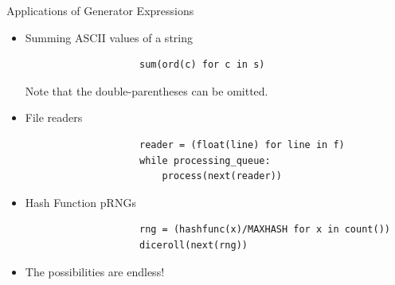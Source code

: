 \documentclass{lug}
\begin{document}
\begin{frame}[fragile]{Applications of Generator Expressions}
    \begin{itemize}[<+->]
        \setlength\itemsep{10pt}
        \item Summing ASCII values of a string

            \begin{minipage}{\linewidth}
                \small
                \begin{verbatim}
                    sum(ord(c) for c in s)
                \end{verbatim}
            \end{minipage}

            {\small Note that the double-parentheses can be omitted.}

        \item File readers
            \smallskip

            \begin{minipage}{\linewidth}
                \small
                \begin{verbatim}
                    reader = (float(line) for line in f)
                    while processing_queue:
                        process(next(reader))
                \end{verbatim}
            \end{minipage}

        \item Hash Function pRNGs
            \smallskip

            \begin{minipage}{\linewidth}
                \small
                \begin{verbatim}
                    rng = (hashfunc(x)/MAXHASH for x in count())
                    diceroll(next(rng))
                \end{verbatim}
            \end{minipage}

        \item The possibilities are endless!
    \end{itemize}
\end{frame}
\end{document}
